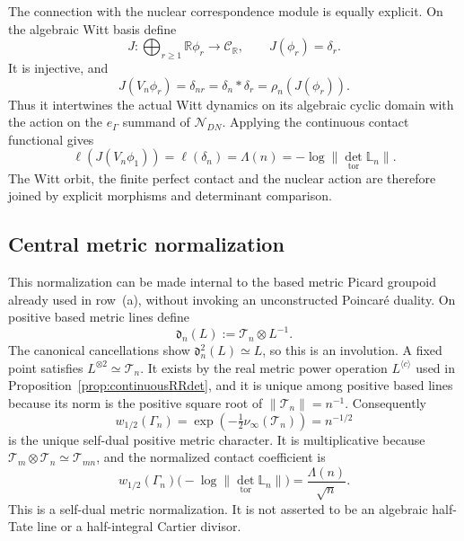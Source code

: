 \documentclass[11pt]{amsart}
\theoremstyle{definition}
\theoremstyle{remark}
\newcommand{\R}{\mathbb R}
\begin{document}
The connection with the nuclear correspondence module is equally
explicit.  On the algebraic Witt basis define
\begin{equation}\label{eq:WittNuclearIntertwiner}
 J:\bigoplus_{r\geq1}\R\phi_r\longrightarrow\mathcal C_{\R},
 \qquad J(\phi_r)=\delta_r.
\end{equation}
It is injective, and
\begin{equation}\label{eq:WittNuclearIntertwining}
 J(V_n\phi_r)=\delta_{nr}=\delta_n*\delta_r
 =\rho_n(J(\phi_r)).
\end{equation}
Thus it intertwines the actual Witt dynamics on its algebraic cyclic domain
with the action on the $e_\Gamma$ summand of $\mathcal N_{DN}$.  Applying
the continuous contact functional gives
\begin{equation}\label{eq:nuclearContactComparison}
 \ell(J(V_n\phi_1))=\ell(\delta_n)=\Lambda(n)
 =-\log\|\det_{\mathrm{tor}}\mathbb L_n\|.
\end{equation}
The Witt orbit, the finite perfect contact and the nuclear action are
therefore joined by explicit morphisms and determinant comparison.

\subsection{Central metric normalization}

This normalization can be made internal to the based metric Picard
groupoid already used in row~(a), without invoking an unconstructed
Poincar\'e duality.  On positive based metric lines define
\[
 \mathfrak d_n(L):=\mathcal T_n\otimes L^{-1}.
\]
The canonical cancellations show
$\mathfrak d_n^2(L)\simeq L$, so this is an involution.  A fixed point
satisfies $L^{\otimes2}\simeq\mathcal T_n$.  It exists by the real metric
power operation $L^{\langle c\rangle}$ used in
Proposition~\ref{prop:continuousRRdet}, and it is unique among positive
based lines because its norm is the positive square root of
$\|\mathcal T_n\|=n^{-1}$.  Consequently
\begin{equation}\label{eq:Tatecharacter}
 w_{1/2}(\Gamma_n)=
 \exp\!\left(-\tfrac12\nu_\infty(\mathcal T_n)\right)=n^{-1/2}
\end{equation}
is the unique self-dual positive metric character.  It is multiplicative
because $\mathcal T_m\otimes\mathcal T_n\simeq\mathcal T_{mn}$, and the
normalized contact coefficient is
\begin{equation}\label{eq:centralLocalCoefficient}
 w_{1/2}(\Gamma_n)
 \bigl(-\log\|\det_{\mathrm{tor}}\mathbb L_n\|\bigr)
 =\frac{\Lambda(n)}{\sqrt n}.
\end{equation}
This is a self-dual metric normalization.  It is not asserted to be an
algebraic half-Tate line or a half-integral Cartier divisor.
\end{document}
